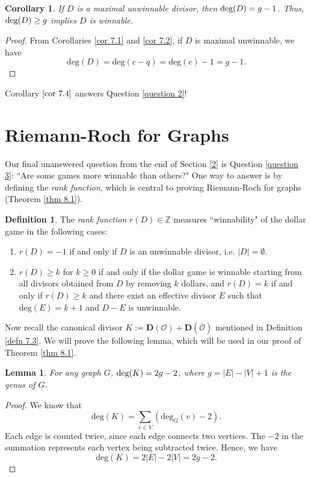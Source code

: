 \documentclass[openany, amssymb, psamsfonts]{amsart}
\newtheorem{cor}{Corollary}[section]
\newtheorem{lem}{Lemma}[section]
\theoremstyle{definition}
\newtheorem{defn}{Definition}[section]
\numberwithin{equation}{section}
\begin{document}
\begin{cor}
\label{cor 7.4}
If $D$ is a maximal unwinnable divisor, then $\textup{deg}(D)=g-1$. Thus, $\textup{deg}(D)\geq g$ implies $D$ is winnable.
\end{cor}
\begin{proof}
From Corollaries \ref{cor 7.1} and \ref{cor 7.2}, if $D$ is maximal unwinnable, we have \[\text{deg}(D)=\text{deg}(c-q)=\text{deg}(c)-1=g-1.\]
\end{proof}

Corollary $\ref{cor 7.4}$ answers Question \ref{question 2}!





\section{Riemann-Roch for Graphs}
\label{8}

Our final unanswered question from the end of Section \ref{2} is Question \ref{question 3}: ``Are some games more winnable than others?" One way to answer is by defining the \textit{rank function}, which is central to proving Riemann-Roch for graphs (Theorem \ref{thm 8.1}). 

\begin{defn}
\label{defn 8.1}
The \textit{rank function} $r(D)\in \mathbb{Z}$ measures ``winnability" of the dollar game in the following cases:
\begin{enumerate}
    \item$r(D)=-1$ if and only if $D$ is an unwinnable divisor, i.e. $|D|=\emptyset$.
    \item$r(D)\geq k$ for $k\geq 0$ if and only if the dollar game is winnable starting from all divisors obtained from $D$ by removing $k$ dollars, and $r(D)=k$ if and only if $r(D)\geq k$ and there exist an effective divisor $E$ such that $\text{deg}(E)=k+1$ and $D-E$ is unwinnable.
\end{enumerate}
\end{defn}

Now recall the canonical divisor $K:=\mathbf{D}(\mathcal{O})+\mathbf{D}(\overline{\mathcal{O}})$ mentioned in Definition \ref{defn 7.3}. We will prove the following lemma, which will be used in our proof of Theorem \ref{thm 8.1}.

\begin{lem}
\label{lem 8.1}
For any graph $G$, $\textup{deg}(K)=2g-2$, where $g=|E|-|V|+1$ is the genus of $G$.
\end{lem}
\begin{proof}
We know that
\[\text{deg}(K)=\sum_{v\in V} (\text{deg}_G(v)-2).\]
Each edge is counted twice, since each edge connects two vertices. The $-2$ in the summation represents each vertex being subtracted twice. Hence, we have
\[\text{deg}(K)=2|E|-2|V|=2g-2.\]
\end{proof}
\end{document}
